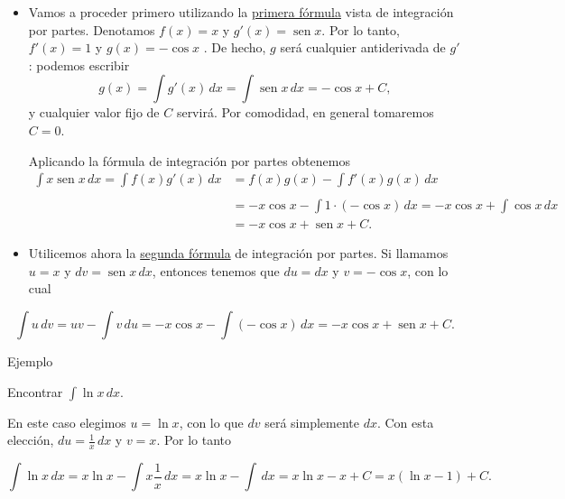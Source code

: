 \documentclass[
  letterpaper,
]{book}
\theoremstyle{plain}
\theoremstyle{remark}
\begin{document}
\begin{tcolorbox}[enhanced jigsaw, opacityback=0, left=2mm, opacitybacktitle=0.6, toprule=.15mm, bottomrule=.15mm, colbacktitle=quarto-callout-tip-color!10!white, titlerule=0mm, bottomtitle=1mm, title=\textcolor{quarto-callout-tip-color}{\faLightbulb}\hspace{0.5em}{Solución}, toptitle=1mm, colframe=quarto-callout-tip-color-frame, colback=white, breakable, rightrule=.15mm, arc=.35mm, leftrule=.75mm, coltitle=black]

\begin{itemize}
\item
  Vamos a proceder primero utilizando la \hyperref[form-partes1]{primera
  fórmula} vista de integración por partes. Denotamos \(f(x)=x\) y
  \(g'(x)=\operatorname{sen} x\). Por lo tanto, \(f'(x)=1\) y
  \(g(x)=-\cos x\) . De hecho, \(g\) será cualquier antiderivada de
  \(g'\): podemos escribir \[
  g(x)=\int g'(x)\,dx=\int \operatorname{sen} x\,dx=-\cos x+C,
  \] y cualquier valor fijo de \(C\) servirá. Por comodidad, en general
  tomaremos \(C=0\).

  Aplicando la fórmula de integración por partes obtenemos \[
  \begin{aligned}
  \int x\operatorname{sen} x\,dx=\int f(x)g'(x)\,dx&=f(x)g(x)-\int f'(x)g(x)\,dx\\
  \\
  &=-x\cos x-\int 1\cdot (-\cos x)\,dx=-x\cos x+\int \cos x\,dx\\
  &=-x\cos x+\operatorname{sen } x + C.
  \end{aligned}
  \]
\item
  Utilicemos ahora la \hyperref[form-partes2]{segunda fórmula} de
  integración por partes. Si llamamos \(u=x\) y
  \(dv=\operatorname{sen} x\,dx\), entonces tenemos que \(du=dx\) y
  \(v=-\cos x\), con lo cual
\end{itemize}

\[
\int u\,dv=uv-\int v\,du=-x\cos x-\int (-\cos x)\,dx=-x\cos x+\operatorname{sen} x+C.
\]

\end{tcolorbox}

Ejemplo

Encontrar \(\displaystyle \int \ln x\,dx\).

\begin{tcolorbox}[enhanced jigsaw, opacityback=0, left=2mm, opacitybacktitle=0.6, toprule=.15mm, bottomrule=.15mm, colbacktitle=quarto-callout-tip-color!10!white, titlerule=0mm, bottomtitle=1mm, title=\textcolor{quarto-callout-tip-color}{\faLightbulb}\hspace{0.5em}{Solución}, toptitle=1mm, colframe=quarto-callout-tip-color-frame, colback=white, breakable, rightrule=.15mm, arc=.35mm, leftrule=.75mm, coltitle=black]

En este caso elegimos \(u=\ln x\), con lo que \(dv\) será simplemente
\(dx\). Con esta elección, \(\displaystyle du=\frac{1}{x}\,dx\) y
\(v=x\). Por lo tanto

\[
\int \ln x\,dx=x\ln x-\int x\frac{1}{x}\,dx=x\ln x-\int\,dx=x\ln x-x+C=x(\ln x-1)+C.
\]

\end{tcolorbox}
\end{document}
